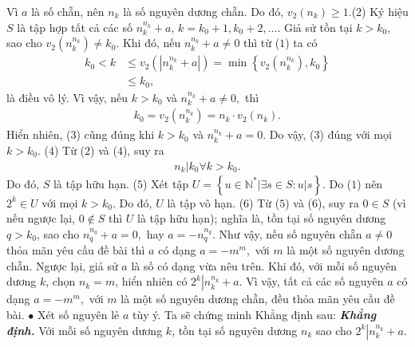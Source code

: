 \begin{multicols}{2}
	Vì $a$ là số chẵn, nên $n_k$  là số nguyên dương chẵn. Do đó, ${v_2}\left( {{n_k}} \right) \ge 1.$\hfill   ($2$)
	\vskip 0.05cm
	Ký hiệu $S$ là tập hợp tất cả các số  $n_k^{{n_k}} + a$, \linebreak$k = {k_0} + 1,{k_0} + 2, \ldots $. 
	\vskip 0.05cm
	Giả sử tồn tại $k > k_0$, sao cho ${v_2}\left( {n_k^{{n_k}}} \right) \ne {k_0}.$  Khi đó, nếu $n_k^{{n_k}} + a \ne 0$  thì từ ($1$) ta có
	\begin{align*}
		{k_0} \!<\! k &\le {v_2}\left( {\left| {n_k^{{n_k}} \!+\! a} \right|} \right) \!=\! \min \left\{ {{v_2}\left( {n_k^{{n_k}}} \right),{k_0}} \right\} \\
		&\le {k_0},
	\end{align*}
	là điều vô lý. Vì vậy, nếu $k\!>\!k_0$  và $n_k^{{n_k}} \!+\! a \!\ne\! 0,$  thì
	\begin{align*}
		{k_0} = {v_2}\left( {n_k^{{n_k}}} \right) = {n_k} \cdot {v_2}\left( {{n_k}} \right). \tag{$3$}
	\end{align*}
	Hiển nhiên, ($3$) cũng đúng khi $k>k_0$  và  $n_k^{{n_k}} + a = 0.$ Do vậy, ($3$) đúng với mọi\linebreak $k > {k_0}.$                   \hfill ($4$)
	\vskip 0.05cm
	Từ ($2$) và ($4$), suy ra
	\begin{align*}
		{n_k}\left| {{k_0}} \right.\forall k > {k_0}.
	\end{align*}
	Do đó, $S$ là tập hữu hạn.       \hfill ($5$)
	\vskip 0.05cm
	Xét tập  $U = \left\{ {u \in \mathbb{N^*}\left| {\exists s \in S:u|s} \right.} \right\}.$
	\vskip 0.05cm
	Do ($1$) nên  $2^k \in U$ với mọi $k > k_0$.  Do đó, $U$ là tập vô hạn.                                                    \hfill             ($6$)
	\vskip 0.05cm
	Từ ($5$) và ($6$), suy ra $0 \in S$  (vì nếu ngược lại, $0 \notin S$  thì $U$ là tập hữu hạn); nghĩa là, tồn tại số nguyên dương $q \!>\! k_0$,  sao cho $n_q^{{n_q}} \!+\! a \!=\! 0,\!$  hay $a =  - n_q^{{n_q}}.$
	\vskip 0.05cm  
	Như vậy, nếu số nguyên chẵn $a \ne  0$ thỏa mãn yêu cầu đề bài thì $a$ có dạng $a =  - {m^m},$  với $m$ là một số nguyên dương chẵn.
	\vskip 0.05cm
	Ngược lại, giả sử $a$ là số có dạng vừa nêu trên. Khi đó, với mỗi số nguyên dương $k$, chọn  $n_k = m$, hiển nhiên có ${2^k}\left| {n_k^{{n_k}} + a} \right..$
	\vskip 0.05cm 
	Vì vậy, tất cả các số nguyên $a$ có dạng $a =  - {m^m},$  với $m$ là một số nguyên dương chẵn, đều thỏa mãn yêu cầu đề bài.
	\vskip 0.05cm
	$\bullet$ Xét số nguyên lẻ $a$ tùy ý.
	\vskip 0.05cm
	Ta sẽ chứng minh Khẳng định sau:
	\vskip 0.05cm
	\textbf{\color{thachthuctoanhoc}\textit{Khẳng định.}} Với mỗi số nguyên dương $k$, tồn tại số nguyên dương  $n_k$ sao cho ${2^k}\left| {n_k^{{n_k}} + a} \right..$

\end{multicols}
